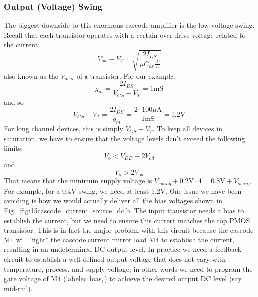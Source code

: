 \subsubsection{Output (Voltage) Swing}
The biggest downside to this enormous cascode amplifier is the low voltage swing.  Recall that each transistor operates with a certain over-drive voltage related to the current:
    \begin{equation}
        V_{od} = V_T + \sqrt{\frac{2 I_{DS}}{\mu C_{ox} \frac{W}{L}}} 
    \end{equation}
also known as the $V_{dsat}$ of a transistor.  For our example:
    \begin{equation} 
        {g_m} = \frac{{2{I_{DS}}}}{{{V_{GS}} - {V_T}}} = 1\mathrm{mS} 
    \end{equation}
and so
    \begin{equation}
        {V_{GS}} - {V_T} = \frac{{2{I_{DS}}}}{{{g_m}}} = \frac{{2 \cdot100\mu \mathrm{A}}}{{1\mathrm{mS}}} = 0.2\mathrm{V} 
    \end{equation}
For long channel devices, this is simply $V_{GS} - V_T$.  To keep all devices in saturation, we have to ensure that the voltage levels don't exceed the following limits:
    \begin{equation}
        V_{o} < V_{DD} - 2 V_{od}
    \end{equation} 
and
    \begin{equation}
        V_{o} >  2 V_{od}
    \end{equation} 
That means that the minimum supply voltage is $V_{swing} + 0.2\mathrm{V} \cdot 4 = 0.8\mathrm{V} + V_{swing}$.  For example, for a 0.4V swing, we need at least 1.2V.  
One issue we have been avoiding is how we would actually deliver all the bias voltages shown in Fig.~\ref{fig:15cascode_current_source_dc}b.  The input transistor needs a bias to establish the current, but we need to ensure this current matches the top PMOS transistor.  This is in fact the major problem with this circuit because the cascode M1 will "fight" the cascode current mirror load M4 to establish the current, resulting in an undetermined DC output level.  In practice we need a feedback circuit to establish a well defined output voltage that does not vary with temperature, process, and supply voltage; in other words we need to program the gate voltage of M4 (labeled bias$_1$) to achieve the desired output DC level (say mid-rail).

